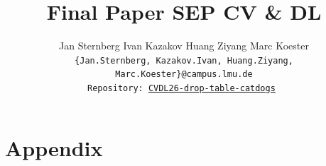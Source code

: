 \documentclass[10pt,twocolumn,letterpaper]{article}
\title{Final Paper SEP CV \& DL}
\author{Jan Sternberg
\quad
Ivan Kazakov
\quad
Huang Ziyang
\quad
Marc Koester\\
\tt\small\{Jan.Sternberg, Kazakov.Ivan, Huang.Ziyang, Marc.Koester\}@campus.lmu.de\\
\small\texttt{Repository: \href{https://github.com/NordlichtS/CVDL26-drop-table-catdogs}{CVDL26-drop-table-catdogs}}
}
\begin{document}
\maketitle
    






{
    \small
    
    
}

\clearpage
\appendix

\section{Appendix}
\label{sec:appendix}

\end{document}
